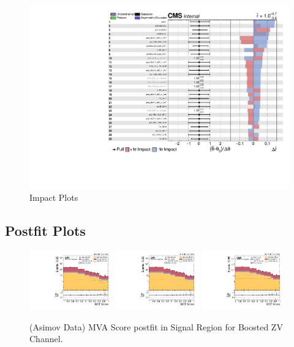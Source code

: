 \begin{figure}[!ht]
  \centering
  \includegraphics[width=\textwidth,page=4]{analysis_plots/impact_plots/impacts_datacard_run2_z.pdf}
  \caption[Impact Plots]%
  {Impact Plots}%
  \label{fig:vbs-impact-plots-page4}
\end{figure}


\clearpage
\subsection{
  Postfit Plots
}

\begin{figure}[!ht]
  \centering
  \includegraphics[width=0.32\textwidth]{analysis_plots/2016_zv.sr_l_postfit/sr_l_postfit/mva_score_zv_var2_log.pdf}
  \includegraphics[width=0.32\textwidth]{analysis_plots/2017_zv.sr_l_postfit/sr_l_postfit/mva_score_zv_var2_log.pdf}
  \includegraphics[width=0.32\textwidth]{analysis_plots/2018_zv.sr_l_postfit/sr_l_postfit/mva_score_zv_var2_log.pdf} \\
  \caption[MVA Score postfit in Signal Region for Boosted ZV Channel]%
  {(Asimov Data) MVA Score postfit in Signal Region for Boosted ZV Channel.}%
  \label{fig:zv-sr-l-mva-score-postfit}
\end{figure}

